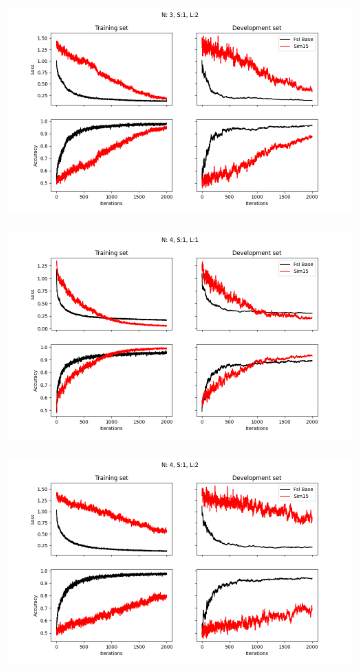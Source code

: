 \begin{figure}[H]
\begin{subfigure}[b]{.49\textwidth}
\end{subfigure}
\begin{subfigure}[b]{.49\textwidth}
    \centering
    \includegraphics[width=\textwidth]{figures/comparison/Epochs_2000--A_0.05--N_3--S_1--L_2.png}
\end{subfigure}
\begin{subfigure}[b]{.49\textwidth}
    \centering
    \includegraphics[width=\textwidth]{figures/comparison/Epochs_2000--A_0.05--N_4--S_1--L_1.png}
\end{subfigure}
\begin{subfigure}[b]{.49\textwidth}
    \centering
    \includegraphics[width=\textwidth]{figures/comparison/Epochs_2000--A_0.05--N_4--S_1--L_2.png}

\end{subfigure}
\end{figure}
